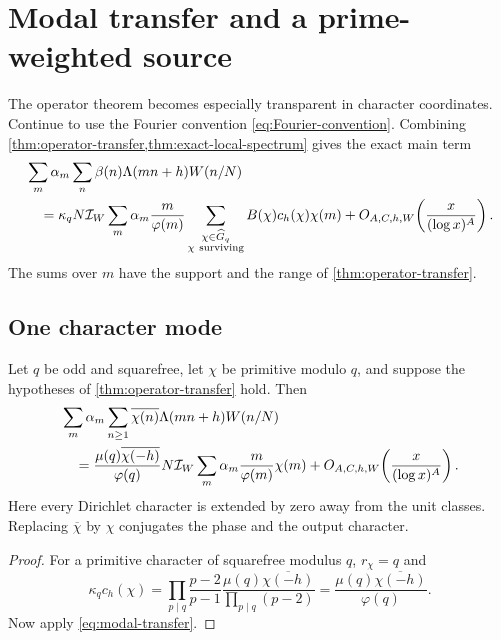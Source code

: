 \section{Modal transfer and a prime-weighted source}
\label{sec:modal-corollaries}

The operator theorem becomes especially transparent in character
coordinates.  Continue to use the Fourier convention
\eqref{eq:Fourier-convention}.  Combining
\cref{thm:operator-transfer,thm:exact-local-spectrum} gives the exact main
term
\begin{align}
 &\sum_m\alpha_m\sum_n\beta(n)\Lambda(mn+h)W(n/N)
 \notag\\
 &\quad=\kappa_qN\mathcal I_W
 \sum_m\alpha_m\frac{m}{\varphi(m)}
 \sum_{\substack{\chi\in\widehat G_q\\\chi\ \mathrm{surviving}}}
 B(\chi)c_h(\chi)\chi(m)
 +O_{A,C,h,W}\!\left(\frac{x}{(\log x)^A}\right).
 \label{eq:modal-transfer}
\end{align}
The sums over $m$ have the support and the range of
\cref{thm:operator-transfer}.

\subsection{One character mode}

\begin{corollary}
\label{cor:primitive-mode}
Let $q$ be odd and squarefree, let $\chi$ be primitive modulo $q$, and
suppose the hypotheses of \cref{thm:operator-transfer} hold.  Then
\begin{align}
 &\sum_m\alpha_m\sum_{n\geq1}
  \overline{\chi(n)}\Lambda(mn+h)W(n/N)
 \notag\\
 &\quad=
 \frac{\mu(q)\overline{\chi(-h)}}{\varphi(q)}
 N\mathcal I_W
 \sum_m\alpha_m\frac{m}{\varphi(m)}\chi(m)
 +O_{A,C,h,W}\!\left(\frac{x}{(\log x)^A}\right).
 \label{eq:primitive-mode-transfer}
\end{align}
Here every Dirichlet character is extended by zero away from the unit
classes.  Replacing $\overline\chi$ by $\chi$ conjugates the phase and the
output character.
\end{corollary}

\begin{proof}
For a primitive character of squarefree modulus $q$,
$r_\chi=q$ and
\[
 \kappa_qc_h(\chi)
 =\prod_{p\mid q}\frac{p-2}{p-1}
  \frac{\mu(q)\overline{\chi(-h)}}{\prod_{p\mid q}(p-2)}
 =\frac{\mu(q)\overline{\chi(-h)}}{\varphi(q)}.
\]
Now apply \eqref{eq:modal-transfer}.
\end{proof}

